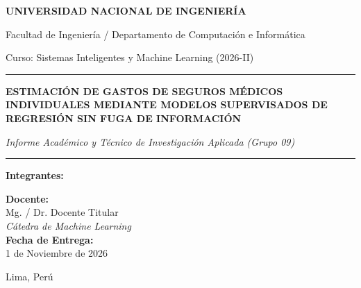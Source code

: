 \documentclass[11pt,a4paper]{article}
\begin{document}
\begin{titlepage}
    \centering
    \vspace*{1.5cm}
    {\Huge\bfseries\color{primary} UNIVERSIDAD NACIONAL DE INGENIERÍA\par}
    \vspace{0.4cm}
    {\Large\color{secondary} Facultad de Ingeniería / Departamento de Computación e Informática\par}
    \vspace{0.2cm}
    {\large Curso: Sistemas Inteligentes y Machine Learning (2026-II)\par}
    
    \vspace{2.5cm}
    \rule{\linewidth}{1.5pt}\par
    \vspace{0.5cm}
    {\LARGE\bfseries\color{primary} ESTIMACIÓN DE GASTOS DE SEGUROS MÉDICOS INDIVIDUALES MEDIANTE MODELOS SUPERVISADOS DE REGRESIÓN SIN FUGA DE INFORMACIÓN\par}
    \vspace{0.3cm}
    {\large\itshape Informe Académico y Técnico de Investigación Aplicada (Grupo 09)\par}
    \vspace{0.5cm}
    \rule{\linewidth}{1.5pt}\par
    
    \vspace{3cm}
    \begin{minipage}{0.48\textwidth}
        \begin{flushleft} \large
            \textbf{Integrantes:}\\
            \vspace{0.8cm}
        \end{flushleft}
    \end{minipage}
    \begin{minipage}{0.48\textwidth}
        \begin{flushright} \large
            \textbf{Docente:}\\
            Mg. / Dr. Docente Titular\\
            \textit{Cátedra de Machine Learning}\\
            \vspace{0.5cm}
            \textbf{Fecha de Entrega:}\\
            1 de Noviembre de 2026
        \end{flushright}
    \end{minipage}
    
    \vfill
    {\small Lima, Perú}
\end{titlepage}
\end{document}

